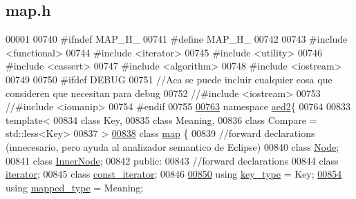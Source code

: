 \hypertarget{map_8h_source}{}\subsection{map.\+h}

\begin{DoxyCode}
00001 
00740 \textcolor{preprocessor}{#ifndef MAP\_H\_}
00741 \textcolor{preprocessor}{#define MAP\_H\_}
00742 
00743 \textcolor{preprocessor}{#include <functional>}
00744 \textcolor{preprocessor}{#include <iterator>}
00745 \textcolor{preprocessor}{#include <utility>}
00746 \textcolor{preprocessor}{#include <cassert>}
00747 \textcolor{preprocessor}{#include <algorithm>}
00748 \textcolor{preprocessor}{#include <iostream>}
00749 
00750 \textcolor{preprocessor}{#ifdef DEBUG}
00751 \textcolor{comment}{//Aca se puede incluir cualquier cosa que consideren que necesitan para debug}
00752 \textcolor{comment}{//#include <iostream>}
00753 \textcolor{comment}{//#include <iomanip>}
00754 \textcolor{preprocessor}{#endif}
00755 
\hyperlink{namespaceaed2}{00763} \textcolor{keyword}{namespace }\hyperlink{namespaceaed2}{aed2}\{
00764 
00833 \textcolor{keyword}{template}<
00834   \textcolor{keyword}{class }Key,
00835   \textcolor{keyword}{class }Meaning,
00836   \textcolor{keyword}{class }Compare = std::less<Key>
00837 >
\hyperlink{classaed2_1_1map}{00838} \textcolor{keyword}{class }\hyperlink{classaed2_1_1map}{map} \{
00839     \textcolor{comment}{//forward declarations (innecesario, pero ayuda al analizador semantico de Eclipse)}
00840     \textcolor{keyword}{class }\hyperlink{structaed2_1_1map_1_1Node}{Node};
00841     \textcolor{keyword}{class }\hyperlink{structaed2_1_1map_1_1InnerNode}{InnerNode};
00842 \textcolor{keyword}{public}:
00843     \textcolor{comment}{//forward declarations}
00844     \textcolor{keyword}{class }\hyperlink{classaed2_1_1map_1_1iterator}{iterator};
00845     \textcolor{keyword}{class }\hyperlink{classaed2_1_1map_1_1const__iterator}{const\_iterator};
00846 
\hyperlink{classaed2_1_1map_a4273e8812e7105a618df58a2c8b72b7d_a4273e8812e7105a618df58a2c8b72b7d}{00850}     \textcolor{keyword}{using} \hyperlink{classaed2_1_1map_a4273e8812e7105a618df58a2c8b72b7d_a4273e8812e7105a618df58a2c8b72b7d}{key\_type} = Key;
\hyperlink{classaed2_1_1map_aa3e34bf624f3009884a71b18f4ddae40_aa3e34bf624f3009884a71b18f4ddae40}{00854}     \textcolor{keyword}{using} \hyperlink{classaed2_1_1map_aa3e34bf624f3009884a71b18f4ddae40_aa3e34bf624f3009884a71b18f4ddae40}{mapped\_type} = Meaning;

\end{DoxyCode}

